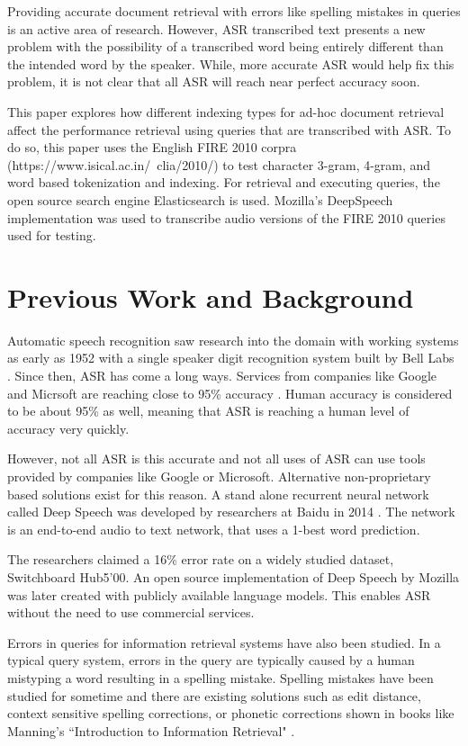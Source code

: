 \documentclass[jair, twoside,11pt,theapa]{article}
\begin{document}
Providing accurate document retrieval with errors like spelling mistakes in queries is an active area of research. However, ASR transcribed text presents a new problem with the possibility of a transcribed word being entirely different than the intended word by the speaker. While, more accurate ASR would help fix this problem, it is not clear that all ASR will reach near perfect accuracy soon. 

This paper explores how different indexing types for ad-hoc document retrieval affect the performance retrieval using queries that are transcribed with ASR. To do so, this paper uses the English FIRE 2010 corpra (https://www.isical.ac.in/~clia/2010/) to test character 3-gram, 4-gram, and word based tokenization and indexing. For retrieval and executing queries, the open source search engine Elasticsearch is used. Mozilla's DeepSpeech implementation \cite{mozilla} was used to transcribe audio versions of the FIRE 2010 queries used for testing. 



\section{Previous Work and Background}
\label{Background}
Automatic speech recognition saw research into the domain with working systems as early as 1952 with a single speaker digit recognition system built by Bell Labs \cite{AsrHistory}. Since then, ASR has come a long ways. Services from companies like Google and Micrsoft are reaching close to 95\% accuracy \cite{Meeker} \cite{MS-human-accuracy}. Human accuracy is considered to be about 95\% \cite{MS-human-accuracy} as well, meaning that ASR is reaching a human level of accuracy very quickly. 

However, not all ASR is this accurate and not all uses of ASR can use tools provided by companies like Google or Microsoft. Alternative non-proprietary based solutions exist for this reason. A stand alone recurrent neural network called Deep Speech was developed by researchers at Baidu in 2014 \cite{Baidu-deep}. The network is an end-to-end audio to text network, that uses a 1-best word prediction. 

The researchers claimed a 16\% error rate on a widely studied dataset, Switchboard Hub5'00. An open source implementation of Deep Speech by Mozilla \cite{mozilla} was later created with publicly available language models. This enables ASR without the need to use commercial services. 

Errors in queries for information retrieval systems have also been studied. In a typical query system, errors in the query are typically caused by a human mistyping a word resulting in a spelling mistake. Spelling mistakes have been studied for sometime and there are existing solutions such as edit distance, context sensitive spelling corrections, or phonetic corrections shown in books like Manning's ``Introduction to Information Retrieval" \cite{IntroductionIR}. 
\end{document}
